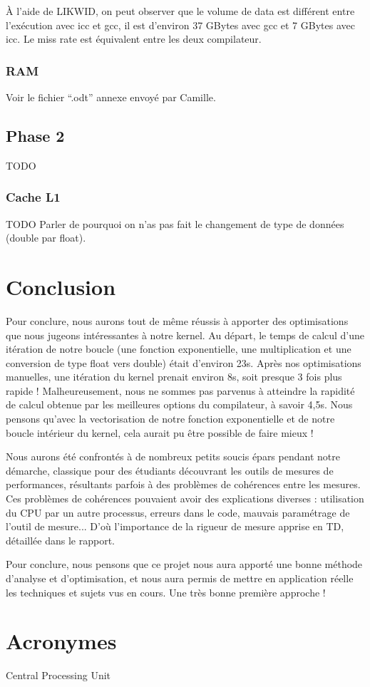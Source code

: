 \documentclass[12pt,a4paper]{article}
\begin{document}
À l'aide de LIKWID, on peut observer que le volume de data est différent 
entre l’exécution avec icc et gcc, il est d'environ 37 GBytes avec gcc et
7 GBytes avec icc. Le miss rate est équivalent entre les deux compilateur.

\subsubsection{RAM}

Voir le fichier \enquote{.odt} annexe envoyé par Camille.

\subsection{Phase 2}

TODO 

\subsubsection{Cache L1}

TODO Parler de pourquoi on n'as pas fait le changement de type de données (double par float).

\section{Conclusion}

Pour conclure, nous aurons tout de même réussis à apporter des optimisations que
nous jugeons intéressantes à notre kernel. Au départ, le temps de calcul d'une
itération de notre boucle (une fonction exponentielle, une multiplication et une
conversion de type float vers double) était d'environ 23s. Après nos
optimisations manuelles, une itération du kernel prenait environ 8s, soit
presque 3 fois plus rapide ! Malheureusement, nous ne sommes pas parvenus à
atteindre la rapidité de calcul obtenue par les meilleures options du
compilateur, à savoir 4,5s. Nous pensons qu'avec la vectorisation de notre
fonction exponentielle et de notre boucle intérieur du kernel, cela aurait pu
être possible de faire mieux !

Nous aurons été confrontés à de nombreux petits soucis épars pendant notre
démarche, classique pour des étudiants découvrant les outils de mesures de
performances, résultants parfois à des problèmes de cohérences entre les
mesures. Ces problèmes de cohérences pouvaient avoir des explications diverses :
utilisation du \acs{CPU} par un autre processus, erreurs dans le code, mauvais
paramétrage de l'outil de mesure... D'où l'importance de la rigueur de mesure
apprise en TD, détaillée dans le rapport.

Pour conclure, nous pensons que ce projet nous aura apporté une bonne méthode
d'analyse et d'optimisation, et nous aura permis de mettre en application réelle
les techniques et sujets vus en cours. Une très bonne première approche !

\newpage
\section*{Acronymes}

\begin{acronym}
      {Central Processing Unit}
\end{acronym}
\end{document}
